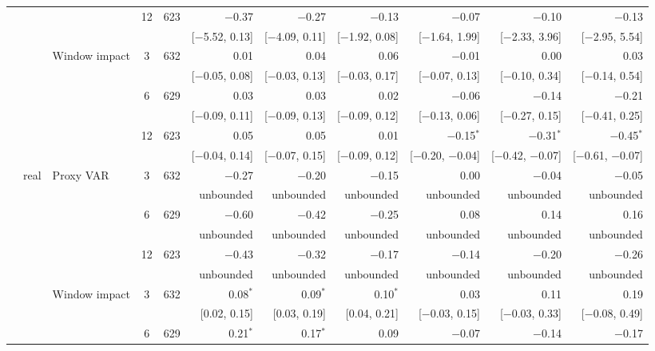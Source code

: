 \begin{longtable}{lllcrrrrrrr}
 &  &  & 12 & 623 & $-$0.37 & $-$0.27 & $-$0.13 & $-$0.07 & $-$0.10 & $-$0.13\\
 & & & & & {\tiny [$-$5.52, 0.13]} & {\tiny [$-$4.09, 0.11]} & {\tiny [$-$1.92, 0.08]} & {\tiny [$-$1.64, 1.99]} & {\tiny [$-$2.33, 3.96]} & {\tiny [$-$2.95, 5.54]}\\
 &  & Window impact & 3 & 632 & 0.01 & 0.04 & 0.06 & $-$0.01 & 0.00 & 0.03\\
 & & & & & {\tiny [$-$0.05, 0.08]} & {\tiny [$-$0.03, 0.13]} & {\tiny [$-$0.03, 0.17]} & {\tiny [$-$0.07, 0.13]} & {\tiny [$-$0.10, 0.34]} & {\tiny [$-$0.14, 0.54]}\\
 &  &  & 6 & 629 & 0.03 & 0.03 & 0.02 & $-$0.06 & $-$0.14 & $-$0.21\\
 & & & & & {\tiny [$-$0.09, 0.11]} & {\tiny [$-$0.09, 0.13]} & {\tiny [$-$0.09, 0.12]} & {\tiny [$-$0.13, 0.06]} & {\tiny [$-$0.27, 0.15]} & {\tiny [$-$0.41, 0.25]}\\
 &  &  & 12 & 623 & 0.05 & 0.05 & 0.01 & $-$0.15$^{*}$ & $-$0.31$^{*}$ & $-$0.45$^{*}$\\
 & & & & & {\tiny [$-$0.04, 0.14]} & {\tiny [$-$0.07, 0.15]} & {\tiny [$-$0.09, 0.12]} & {\tiny [$-$0.20, $-$0.04]} & {\tiny [$-$0.42, $-$0.07]} & {\tiny [$-$0.61, $-$0.07]}\\
 & real & Proxy VAR & 3 & 632 & $-$0.27 & $-$0.20 & $-$0.15 & 0.00 & $-$0.04 & $-$0.05\\
 & & & & & {\tiny unbounded} & {\tiny unbounded} & {\tiny unbounded} & {\tiny unbounded} & {\tiny unbounded} & {\tiny unbounded}\\
 &  &  & 6 & 629 & $-$0.60 & $-$0.42 & $-$0.25 & 0.08 & 0.14 & 0.16\\
 & & & & & {\tiny unbounded} & {\tiny unbounded} & {\tiny unbounded} & {\tiny unbounded} & {\tiny unbounded} & {\tiny unbounded}\\
 &  &  & 12 & 623 & $-$0.43 & $-$0.32 & $-$0.17 & $-$0.14 & $-$0.20 & $-$0.26\\
 & & & & & {\tiny unbounded} & {\tiny unbounded} & {\tiny unbounded} & {\tiny unbounded} & {\tiny unbounded} & {\tiny unbounded}\\
 &  & Window impact & 3 & 632 & 0.08$^{*}$ & 0.09$^{*}$ & 0.10$^{*}$ & 0.03 & 0.11 & 0.19\\
 & & & & & {\tiny [0.02, 0.15]} & {\tiny [0.03, 0.19]} & {\tiny [0.04, 0.21]} & {\tiny [$-$0.03, 0.15]} & {\tiny [$-$0.03, 0.33]} & {\tiny [$-$0.08, 0.49]}\\
 &  &  & 6 & 629 & 0.21$^{*}$ & 0.17$^{*}$ & 0.09 & $-$0.07 & $-$0.14 & $-$0.17\\

\end{longtable}
